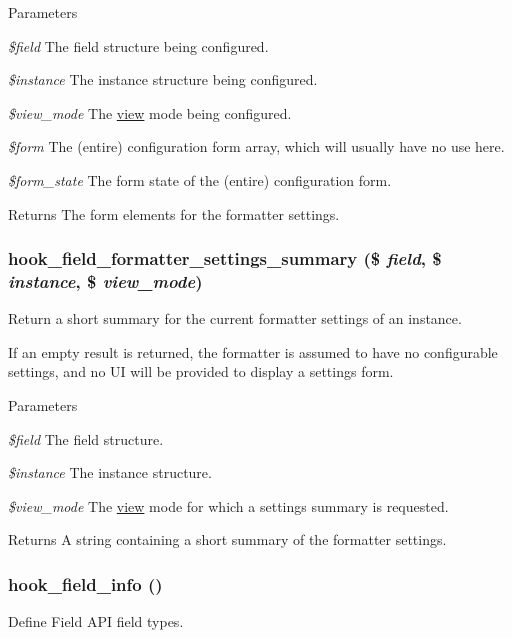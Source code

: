 \begin{DoxyParams}{Parameters}
\item[{\em \$field}]The field structure being configured. \item[{\em \$instance}]The instance structure being configured. \item[{\em \$view\_\-mode}]The \hyperlink{classview}{view} mode being configured. \item[{\em \$form}]The (entire) configuration form array, which will usually have no use here. \item[{\em \$form\_\-state}]The form state of the (entire) configuration form.\end{DoxyParams}
\begin{DoxyReturn}{Returns}
The form elements for the formatter settings. 
\end{DoxyReturn}
\hypertarget{group__field__types_ga0cdef0fb8588dde07292df1b86f06d81}{
\subsubsection[{hook\_\-field\_\-formatter\_\-settings\_\-summary}]{\setlength{\rightskip}{0pt plus 5cm}hook\_\-field\_\-formatter\_\-settings\_\-summary (\$ {\em field}, \/  \$ {\em instance}, \/  \$ {\em view\_\-mode})}}
\label{group__field__types_ga0cdef0fb8588dde07292df1b86f06d81}
Return a short summary for the current formatter settings of an instance.

If an empty result is returned, the formatter is assumed to have no configurable settings, and no UI will be provided to display a settings form.


\begin{DoxyParams}{Parameters}
\item[{\em \$field}]The field structure. \item[{\em \$instance}]The instance structure. \item[{\em \$view\_\-mode}]The \hyperlink{classview}{view} mode for which a settings summary is requested.\end{DoxyParams}
\begin{DoxyReturn}{Returns}
A string containing a short summary of the formatter settings. 
\end{DoxyReturn}
\hypertarget{group__field__types_gad3eb779f26f41b520f19af011ece3eb1}{
\subsubsection[{hook\_\-field\_\-info}]{\setlength{\rightskip}{0pt plus 5cm}hook\_\-field\_\-info ()}}
\label{group__field__types_gad3eb779f26f41b520f19af011ece3eb1}
Define Field API field types.


